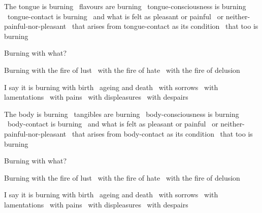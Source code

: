 \begin{english-only-hang}
  The tongue is burning \breathmark\ flavours are burning \breathmark\ tongue-consciousness is burning \breathmark\ tongue-contact is burning \breathmark\ and what is felt as pleasant or painful \breathmark\ or neither-painful-nor-pleasant \breathmark\ that arises from tongue-contact as its condition \breathmark\ that too is burning
\end{english-only-hang}
\begin{english-only-hangtogether}
  Burning with what?
\end{english-only-hangtogether}
\begin{english-only-hangtogether}
  Burning with the fire of lust \breathmark\ with the fire of hate \breathmark\ with the fire of delusion
\end{english-only-hangtogether}
\begin{english-only-hangtogether}
  I say it is burning with birth \breathmark\ ageing and death \breathmark\ with sorrows \breathmark\ with lamentations \breathmark\ with pains \breathmark\ with displeasures \breathmark\ with despairs
\end{english-only-hangtogether}

\begin{english-only-hang}
  The body is burning \breathmark\ tangibles are burning \breathmark\ body-consciousness is burning \breathmark\ body-contact is burning \breathmark\ and what is felt as pleasant or painful \breathmark\ or neither-painful-nor-pleasant \breathmark\ that arises from body-contact as its condition \breathmark\ that too is burning
\end{english-only-hang}
\begin{english-only-hangtogether}
  Burning with what?
\end{english-only-hangtogether}
\begin{english-only-hangtogether}
  Burning with the fire of lust \breathmark\ with the fire of hate \breathmark\ with the fire of delusion
\end{english-only-hangtogether}
\begin{english-only-hangtogether}
  I say it is burning with birth \breathmark\ ageing and death \breathmark\ with sorrows \breathmark\ with lamentations \breathmark\ with pains \breathmark\ with displeasures \breathmark\ with despairs
\end{english-only-hangtogether}


